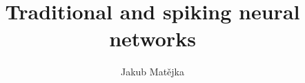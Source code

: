 \documentclass[english,BP]{thesiskiv}
\author{Jakub Matějka}
\title{Traditional and spiking neural networks}
\begin{document}
%
\maketitle
\tableofcontents

















%
%

{\raggedright\small

}
\end{document}
